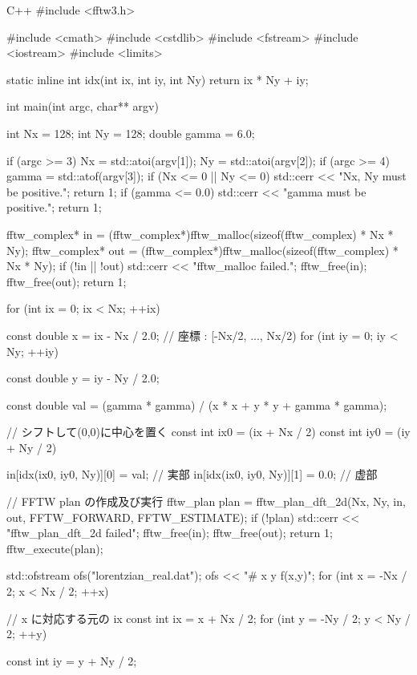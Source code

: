 \documentclass[12pt]{jreport}
\begin{document}
\begin{codebox}{C++}
#include <fftw3.h>

#include <cmath>
#include <cstdlib>
#include <fstream>
#include <iostream>
#include <limits>

static inline int idx(int ix, int iy, int Ny) { return ix * Ny + iy; }

int main(int argc, char** argv) {
    int Nx = 128;
    int Ny = 128;
    double gamma = 6.0;

    if (argc >= 3) {
        Nx = std::atoi(argv[1]);
        Ny = std::atoi(argv[2]);
    }
    if (argc >= 4) {
        gamma = std::atof(argv[3]);
    }
    if (Nx <= 0 || Ny <= 0) {
        std::cerr << "Nx, Ny must be positive.\n";
        return 1;
    }
    if (gamma <= 0.0) {
        std::cerr << "gamma must be positive.\n";
        return 1;
    }

    fftw_complex* in  = (fftw_complex*)fftw_malloc(sizeof(fftw_complex) * Nx * Ny);
    fftw_complex* out = (fftw_complex*)fftw_malloc(sizeof(fftw_complex) * Nx * Ny);
    if (!in || !out) {
        std::cerr << "fftw_malloc failed.\n";
        fftw_free(in);
        fftw_free(out);
        return 1;
    }

    for (int ix = 0; ix < Nx; ++ix) {
        const double x = ix - Nx / 2.0;  // 座標 : [-Nx/2, ..., Nx/2)
        for (int iy = 0; iy < Ny; ++iy) {
            const double y = iy - Ny / 2.0;

            const double val = (gamma * gamma) / (x * x + y * y + gamma * gamma);

            // シフトして(0,0)に中心を置く
            const int ix0 = (ix + Nx / 2) %
            const int iy0 = (iy + Ny / 2) %

            in[idx(ix0, iy0, Ny)][0] = val;  // 実部
            in[idx(ix0, iy0, Ny)][1] = 0.0;  // 虚部
        }
    }

    // FFTW plan の作成及び実行
    fftw_plan plan = fftw_plan_dft_2d(Nx, Ny, in, out, FFTW_FORWARD, FFTW_ESTIMATE);
    if (!plan) {
        std::cerr << "fftw_plan_dft_2d failed\n";
        fftw_free(in);
        fftw_free(out);
        return 1;
    }
    fftw_execute(plan);

    {
        std::ofstream ofs("lorentzian_real.dat");
        ofs << "# x y f(x,y)\n";
        for (int x = -Nx / 2; x < Nx / 2; ++x) {
            // x に対応する元の ix
            const int ix = x + Nx / 2;
            for (int y = -Ny / 2; y < Ny / 2; ++y) {
                const int iy = y + Ny / 2;

}}}}
\end{codebox}
\end{document}
